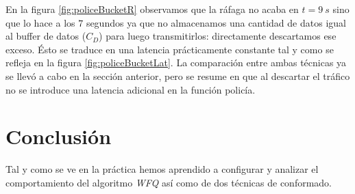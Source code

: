 \documentclass[11pt]{article}
\begin{document}
            En la figura \ref{fig:policeBucketR} observamos que la ráfaga no acaba en $t = 9\ s$ sino que lo hace a los $7$ segundos ya que no almacenamos una cantidad de datos igual al buffer de datos ($C_D$) para luego transmitirlos: directamente descartamos ese exceso. Ésto se traduce en una latencia prácticamente constante tal y como se refleja en la figura \ref{fig:policeBucketLat}. La comparación entre ambas técnicas ya se llevó a cabo en la sección anterior, pero se resume en que al descartar el tráfico no se introduce una latencia adicional en la función policía.

    \section{Conclusión}
            Tal y como se ve en la práctica hemos aprendido a configurar y analizar el comportamiento del algoritmo \textit{WFQ} así como de dos técnicas de conformado.
\end{document}
